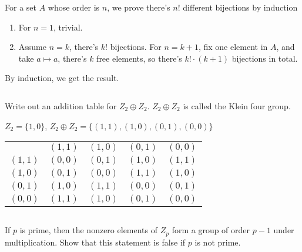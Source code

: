 \begin{answer}
    For a set $A$ whose order is $n$, we prove there's $n!$ different bijections by induction
    \begin{enumerate}
        \item For $n=1$, trivial.
        \item Assume $n=k$, there's $k!$ bijections. For $n=k+1$, fix one element in $A$, and take $a\mapsto a$, there's $k$ free elements, so there's $k!\cdot(k+1)$ bijections in total.
    \end{enumerate}
    By induction, we get the result.
\end{answer}

$$ $$

\begin{ex}
    Write out an addition table for $Z_2\oplus Z_2$. $Z_2\oplus Z_2$ is called the Klein four group.
\end{ex}

\begin{answer}
    $Z_2=\{1,0\}$, $Z_2\oplus Z_2=\{(1,1), (1,0), (0,1), (0,0)\}$
    \begin{table}[H]
        \centering
        \begin{tabular}{c|cccc}
            \multicolumn{1}{c}{} & $(1,1)$ & $(1,0)$ & $(0,1)$ & $(0,0)$\\
            \cline{2-5}
            $(1,1)$ & $(0,0)$ & $(0,1)$ & $(1,0)$ & $(1,1)$ \\
            $(1,0)$ &$(0,1)$  & $(0,0)$ & $(1,1)$ & $(1,0)$ \\
            $(0,1)$ & $(1,0)$ & $(1,1)$ & $(0,0)$ & $(0,1)$ \\
            $(0,0)$ & $(1,1)$ & $(1,0)$ & $(0,1)$ & $(0,0)$
        \end{tabular}
    \end{table}
\end{answer}

$$ $$

\begin{ex}
    If $p$ is prime, then the nonzero elements of $Z_p$ form a group of order $p - 1$ under multiplication. Show that this statement is false if $p$ is not prime.
\end{ex}

